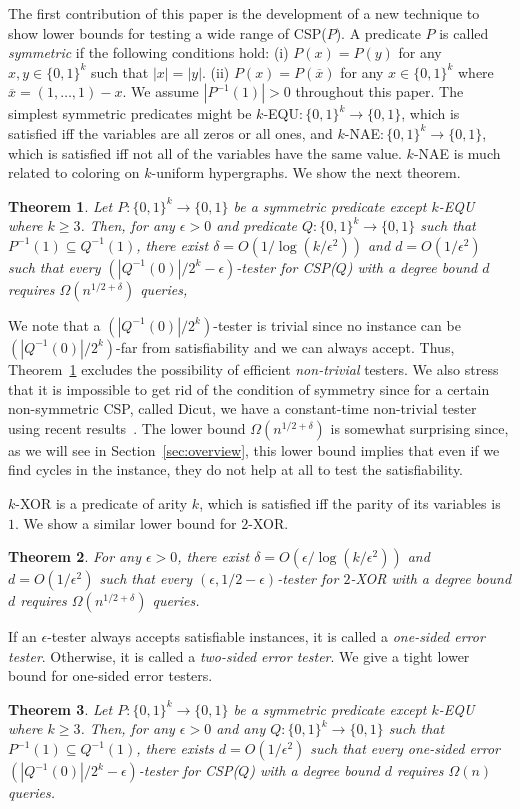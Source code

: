 \documentclass[letterpaper,11pt]{article}
\newtheorem{theorem}{Theorem}[section]
\newcommand{\bit}{\{0,1\}}
\newcommand{\csp}[1]{\textsf{CSP}(#1)\xspace}
\newcommand{\txor}{\textsf{$2$-XOR}\xspace}
\newcommand{\kxor}{$k$-\textsf{XOR}\xspace}
\newcommand{\kequ}{$k$-\textsf{EQU}\xspace}
\newcommand{\knae}{$k$-\textsf{NAE}\xspace}
\begin{document}
The first contribution of this paper is the development of a new technique to show lower bounds for testing a wide range of \csp{$P$}.
A predicate $P$ is called \textit{symmetric} if the following conditions hold: 
(i) $P(x)=P(y)$ for any $x,y\in \bit^k$ such that $|x|=|y|$.
(ii) $P(x)=P(\overline{x})$ for any $x\in \bit^k$ where $\overline{x}=(1,\ldots,1)-x$.
We assume $|P^{-1}(1)|>0$ throughout this paper.
The simplest symmetric predicates might be \kequ$:\bit^k\to \bit$, 
which is satisfied iff the variables are all zeros or all ones,
and \knae$:\bit^k\to \bit$,
which is satisfied iff not all of the variables have the same value.
\knae is much related to coloring on $k$-uniform hypergraphs.
We show the next theorem.
\begin{theorem}\label{thr:two-sided}
  Let $P:\bit^k\to\bit$ be a symmetric predicate except \kequ where $k\geq 3$.
  Then, for any $\epsilon>0$ and predicate $Q:\bit^k\to\bit$ such that $P^{-1}(1)\subseteq Q^{-1}(1)$,
  there exist $\delta=O(1/\log (k/\epsilon^2))$ and $d=O(1/\epsilon^2)$ such that 
  every $(|Q^{-1}(0)|/2^k-\epsilon)$-tester for \csp{$Q$} with a degree bound $d$ requires $\Omega(n^{1/2+\delta})$ queries,
\end{theorem}
We note that a $(|Q^{-1}(0)|/2^k)$-tester is trivial since no instance can be $(|Q^{-1}(0)|/2^k)$-far from satisfiability and we can always accept.
Thus, Theorem~\ref{thr:two-sided} excludes the possibility of efficient \textit{non-trivial} testers.
We also stress that it is impossible to get rid of the condition of symmetry since for a certain non-symmetric CSP, 
called \textsf{Dicut}, we have a constant-time non-trivial tester using recent results~\cite{Tre98,Yos10}.
The lower bound $\Omega(n^{1/2+\delta})$ is somewhat surprising since, 
as we will see in Section~\ref{sec:overview}, 
this lower bound implies that even if we find cycles in the instance,
they do not help at all to test the satisfiability.

\kxor is a predicate of arity $k$, 
which is satisfied iff the parity of its variables is $1$.
We show a similar lower bound for \txor.
\begin{theorem}\label{thr:txor}
  For any $\epsilon>0$,
  there exist $\delta=O(\epsilon/\log(k/\epsilon^2))$ and $d=O(1/\epsilon^2)$ such that every $(\epsilon,1/2-\epsilon)$-tester for \txor with a degree bound $d$ requires $\Omega(n^{1/2+\delta})$ queries.
\end{theorem}

If an $\epsilon$-tester always accepts satisfiable instances,
it is called a \textit{one-sided error tester}.
Otherwise, it is called a \textit{two-sided error tester}.
We give a tight lower bound for one-sided error testers.
\begin{theorem}\label{thr:one-sided}
  Let $P:\bit^k\to\bit$ be a symmetric predicate except \kequ where $k\geq 3$.
  Then, for any $\epsilon>0$ and any $Q:\bit^k\to\bit$ such that $P^{-1}(1)\subseteq Q^{-1}(1)$,
  there exists $d=O(1/\epsilon^2)$ such that
  every one-sided error $(|Q^{-1}(0)|/2^k-\epsilon)$-tester for \csp{$Q$} with a degree bound $d$ requires $\Omega(n)$ queries.
\end{theorem}
\end{document}
